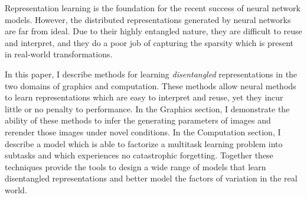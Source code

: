 \documentclass[12pt,twoside]{mitthesis}
\begin{document}


\cleardoublepage
\setcounter{savepage}{\thepage}
\begin{abstractpage}
Representation learning is the foundation for the recent success of
neural network models. However, the distributed representations
generated by neural networks are far from ideal. Due to their highly
entangled nature, they are difficult to reuse and interpret, and they do
a poor job of capturing the sparsity which is present in real-world
transformations.

In this paper, I describe methods for learning \emph{disentangled}
representations in the two domains of graphics and computation. These
methods allow neural methods to learn representations which are easy to
interpret and reuse, yet they incur little or no penalty to performance.
In the Graphics section, I demonstrate the ability of these methods to
infer the generating parameters of images and rerender those images
under novel conditions. In the Computation section, I describe a model
which is able to factorize a multitask learning problem into subtasks
and which experiences no catastrophic forgetting. Together these
techniques provide the tools to design a wide range of models that learn
disentangled representations and better model the factors of variation
in the real world.
\end{abstractpage}

% 
\end{document}
